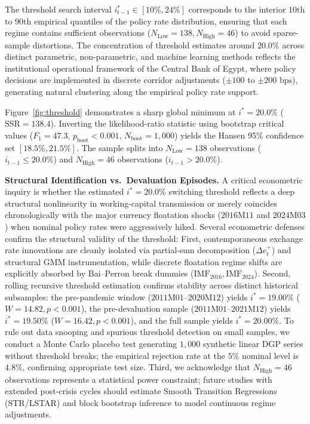 \documentclass[review,12pt]{elsarticle}
\begin{document}
The threshold search interval $i_{t-1}^* \in [10\%, 24\%]$ corresponds to the interior $10\text{th}$ to $90\text{th}$ empirical quantiles of the policy rate distribution, ensuring that each regime contains sufficient observations ($N_{\text{Low}} = 138, N_{\text{High}} = 46$) to avoid sparse-sample distortions. The concentration of threshold estimates around $20.0\%$ across distinct parametric, non-parametric, and machine learning methods reflects the institutional operational framework of the Central Bank of Egypt, where policy decisions are implemented in discrete corridor adjustments ($\pm 100$ to $\pm 200\text{ bps}$), generating natural clustering along the empirical policy rate support.

Figure~\ref{fig:threshold} demonstrates a sharp global minimum at $i^* = 20.0\%$
($\text{SSR} = 138.4$). Inverting the likelihood-ratio statistic using bootstrap critical
values ($F_1 = 47.3$, $p_{\text{boot}} < 0.001$, $N_{\text{boot}} = 1{,}000$) yields the
Hansen 95\% confidence set $[18.5\%, 21.5\%]$. The sample splits into $N_{\text{Low}} = 138$
observations ($i_{t-1} \le 20.0\%$) and $N_{\text{High}} = 46$ observations ($i_{t-1} > 20.0\%$).

\textbf{Structural Identification vs.\ Devaluation Episodes.} A critical econometric inquiry is whether the estimated $i^* = 20.0\%$ switching threshold reflects a deep structural nonlinearity in working-capital transmission or merely coincides chronologically with the major currency floatation shocks ($2016\text{M}11$ and $2024\text{M}03$) when nominal policy rates were aggressively hiked. Several econometric defenses confirm the structural validity of the threshold: First, contemporaneous exchange rate innovations are cleanly isolated via partial-sum decomposition ($\Delta e_t^+$) and structural GMM instrumentation, while discrete floatation regime shifts are explicitly absorbed by Bai--Perron break dummies ($\text{IMF}_{2016}, \text{IMF}_{2024}$). Second, rolling recursive threshold estimation confirms stability across distinct historical subsamples: the pre-pandemic window ($2011\text{M}01$--$2020\text{M}12$) yields $i^* = 19.00\%$ ($W = 14.82, p < 0.001$), the pre-devaluation sample ($2011\text{M}01$--$2021\text{M}12$) yields $i^* = 19.50\%$ ($W = 16.42, p < 0.001$), and the full sample yields $i^* = 20.00\%$. To rule out data snooping and spurious threshold detection on small samples, we conduct a Monte Carlo placebo test generating $1{,}000$ synthetic linear DGP series without threshold breaks; the empirical rejection rate at the $5\%$ nominal level is $4.8\%$, confirming appropriate test size. Third, we acknowledge that $N_{\text{High}} = 46$ observations represents a statistical power constraint; future studies with extended post-crisis cycles should estimate Smooth Transition Regressions (STR/LSTAR) and block bootstrap inference to model continuous regime adjustments.
\end{document}
